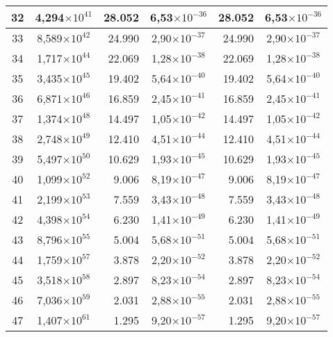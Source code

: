 \begin{table}[!hbt]
\begin{tabular}{| c  r  r  c  r  c |}
    32 & \multicolumn{1}{c}{4,294$\times 10^{41}$} & 28.052 & 6,53$\times 10^{-36}$ & 28.052 & 6,53$\times 10^{-36}$ \\ \hline  
    33 & \multicolumn{1}{c}{8,589$\times 10^{42}$} & 24.990 & 2,90$\times 10^{-37}$ & 24.990 & 2,90$\times 10^{-37}$ \\ \hline
    34 & \multicolumn{1}{c}{1,717$\times 10^{44}$} & 22.069 & 1,28$\times 10^{-38}$ & 22.069 & 1,28$\times 10^{-38}$ \\ \hline  
    35 & \multicolumn{1}{c}{3,435$\times 10^{45}$} & 19.402 & 5,64$\times 10^{-40}$ & 19.402 & 5,64$\times 10^{-40}$ \\ \hline
    36 & \multicolumn{1}{c}{6,871$\times 10^{46}$} & 16.859 & 2,45$\times 10^{-41}$ & 16.859 & 2,45$\times 10^{-41}$ \\ \hline  
    37 & \multicolumn{1}{c}{1,374$\times 10^{48}$} & 14.497 & 1,05$\times 10^{-42}$ & 14.497 & 1,05$\times 10^{-42}$ \\ \hline
    38 & \multicolumn{1}{c}{2,748$\times 10^{49}$} & 12.410 & 4,51$\times 10^{-44}$ & 12.410 & 4,51$\times 10^{-44}$ \\ \hline  
    39 & \multicolumn{1}{c}{5,497$\times 10^{50}$} & 10.629 & 1,93$\times 10^{-45}$ & 10.629 & 1,93$\times 10^{-45}$ \\ \hline
    40 & \multicolumn{1}{c}{1,099$\times 10^{52}$} & 9.006 & 8,19$\times 10^{-47}$ & 9.006 & 8,19$\times 10^{-47}$ \\ \hline  
    41 & \multicolumn{1}{c}{2,199$\times 10^{53}$} & 7.559 & 3,43$\times 10^{-48}$ & 7.559 & 3,43$\times 10^{-48}$ \\ \hline
    42 & \multicolumn{1}{c}{4,398$\times 10^{54}$} & 6.230 & 1,41$\times 10^{-49}$ & 6.230 & 1,41$\times 10^{-49}$ \\ \hline  
    43 & \multicolumn{1}{c}{8,796$\times 10^{55}$} & 5.004 & 5,68$\times 10^{-51}$ & 5.004 & 5,68$\times 10^{-51}$ \\ \hline
    44 & \multicolumn{1}{c}{1,759$\times 10^{57}$} & 3.878 & 2,20$\times 10^{-52}$ & 3.878 & 2,20$\times 10^{-52}$ \\ \hline  
    45 & \multicolumn{1}{c}{3,518$\times 10^{58}$} & 2.897 & 8,23$\times 10^{-54}$ & 2.897 & 8,23$\times 10^{-54}$ \\ \hline
    46 & \multicolumn{1}{c}{7,036$\times 10^{59}$} & 2.031 & 2,88$\times 10^{-55}$ & 2.031 & 2,88$\times 10^{-55}$ \\ \hline  
    47 & \multicolumn{1}{c}{1,407$\times 10^{61}$} & 1.295 & 9,20$\times 10^{-57}$ & 1.295 & 9,20$\times 10^{-57}$ \\ \hline

\end{tabular}
\end{table}
